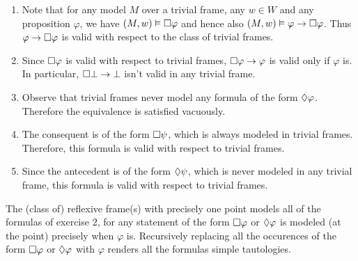 \documentclass{article}
\begin{document}
\begin{ex}
\begin{enumerate}
\item Note that for any model $M$ over a trivial frame, any $w\in W$ and any proposition 
$\varphi$, we have $(M,w)\vDash\square\varphi$ and hence also $(M,w)\vDash\varphi\to\square\varphi$.
Thus $\varphi\to\square\varphi$ is valid with respect to the class of trivial frames.
\item Since $\square\varphi$ is valid with respect to trivial frames, $\square\varphi\to\varphi$
is valid only if $\varphi$ is. In particular, $\square\bot\to\bot$ isn't valid in
any trivial frame.
\item Observe that trivial frames never model any formula of the form $\lozenge\varphi$. Therefore the equivalence is satisfied vacuously.
\item The consequent is of the form $\square\psi$, which is always modeled in trivial frames. Therefore, this formula is valid with respect to trivial frames.
\item Since the antecedent is of the form $\lozenge\psi$, which is never modeled in any trivial frame, this formula is valid with respect to trivial frames.
\end{enumerate}
\end{ex}

\begin{ex}
The (class of) reflexive frame(s) with precisely one point models all of the formulas of exercise 2, for any statement of the form $\square\varphi$ or $\lozenge\varphi$ is modeled (at the point) precisely when $\varphi$ is. Recursively replacing all the occurences of the form $\square\varphi$ or $\lozenge\varphi$ with $\varphi$ renders all the formulas simple tautologies.
\end{ex}
\end{document}
